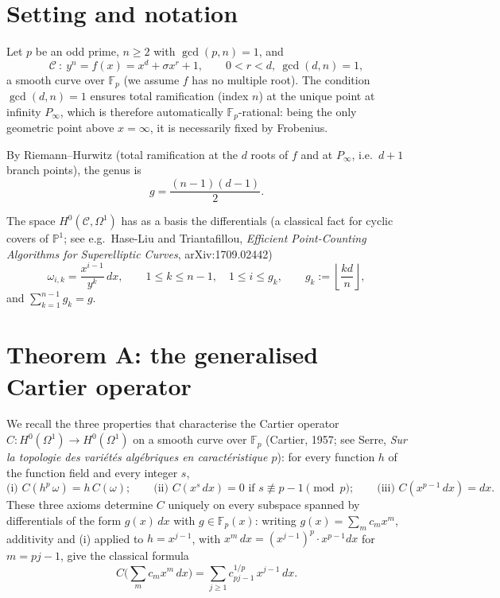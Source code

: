 \documentclass[11pt,a4paper]{article}
\newcommand{\F}{\mathbb{F}}
\begin{document}
\section{Setting and notation}

Let $p$ be an odd prime, $n\ge2$ with $\gcd(p,n)=1$, and
$$\mathcal{C}\ :\ y^n = f(x) = x^d+\sigma x^r+1,\qquad 0<r<d,\ \gcd(d,n)=1,$$
a smooth curve over $\F_p$ (we assume $f$ has no multiple root). The condition
$\gcd(d,n)=1$ ensures total ramification (index $n$) at the unique point at
infinity $P_\infty$, which is therefore automatically $\F_p$-rational: being the
only geometric point above $x=\infty$, it is necessarily fixed by Frobenius.

By Riemann--Hurwitz (total ramification at the $d$ roots of $f$ and at
$P_\infty$, i.e.\ $d+1$ branch points), the genus is
$$g=\frac{(n-1)(d-1)}{2}.$$

The space $H^0(\mathcal{C},\Omega^1)$ has as a basis the differentials (a
classical fact for cyclic covers of $\mathbb{P}^1$; see e.g.\ Hase-Liu and
Triantafillou, \emph{Efficient Point-Counting Algorithms for Superelliptic
Curves}, arXiv:1709.02442)
$$\omega_{i,k}=\frac{x^{i-1}}{y^k}\,dx,\qquad 1\le k\le n-1,\quad 1\le i\le
g_k,\qquad g_k:=\left\lfloor\frac{kd}{n}\right\rfloor,$$
and $\sum_{k=1}^{n-1}g_k=g$.

\section{Theorem A: the generalised Cartier operator}

We recall the three properties that characterise the Cartier operator
$C:H^0(\Omega^1)\to H^0(\Omega^1)$ on a smooth curve over $\F_p$ (Cartier, 1957;
see Serre, \emph{Sur la topologie des vari\'et\'es alg\'ebriques en
caract\'eristique $p$}): for every function $h$ of the function field and every
integer $s$,
$$\text{(i) } C(h^p\,\omega)=h\,C(\omega);\qquad
\text{(ii) } C(x^s\,dx)=0 \text{ if } s\not\equiv p-1\!\!\pmod p;\qquad
\text{(iii) } C(x^{p-1}\,dx)=dx.$$
These three axioms determine $C$ uniquely on every subspace spanned by
differentials of the form $g(x)\,dx$ with $g\in\F_p(x)$: writing
$g(x)=\sum_m c_m x^m$, additivity and (i) applied to $h=x^{j-1}$, with
$x^m\,dx=(x^{j-1})^p\cdot x^{p-1}dx$ for $m=pj-1$, give the classical formula
\begin{equation}
C\Big(\sum_m c_m x^m\,dx\Big)=\sum_{j\ge1} c_{pj-1}^{1/p}\,x^{j-1}\,dx. \tag{$\star$}
\end{equation}
\end{document}
